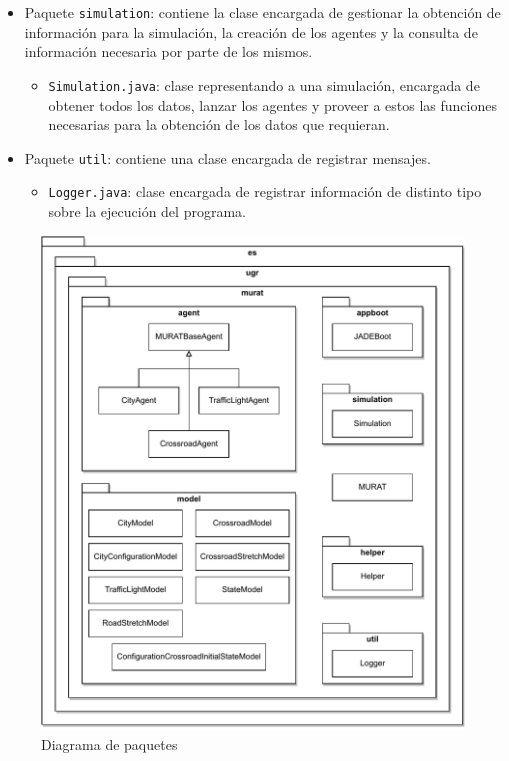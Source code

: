 \begin{itemize}
\begin{itemize}
    \end{itemize}
    \item Paquete \lstinline{simulation}: contiene la clase encargada de gestionar la obtención de información para la simulación, la creación de los agentes y la consulta de información necesaria por parte de los mismos.
    \begin{itemize}
        \item \lstinline{Simulation.java}: clase representando a una simulación, encargada de obtener todos los datos, lanzar los agentes y proveer a estos las funciones necesarias para la obtención de los datos que requieran.
    \end{itemize}
    \item Paquete \lstinline{util}: contiene una clase encargada de registrar mensajes.
    \begin{itemize}
        \item \lstinline{Logger.java}: clase encargada de registrar información de distinto tipo sobre la ejecución del programa.
    \end{itemize}
\end{itemize}

\newpage
\begin{figure}[H]
    \centering
    \includegraphics[width=1\linewidth]{text/image/DPaq.pdf}
    \caption{Diagrama de paquetes}
    \label{fig:diagrama_paquetes}
\end{figure}

